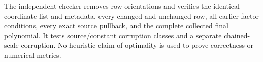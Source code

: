 The independent checker removes row orientations and verifies the
identical coordinate list and metadata, every changed and unchanged row,
all earlier-factor conditions, every exact source pullback, and the
complete collected final polynomial. It tests source/constant corruption
classes and a separate chained-scale corruption. No heuristic claim of
optimality is used to prove correctness or numerical metrics.

